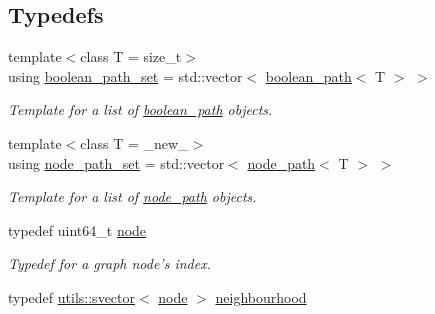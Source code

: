\subsection*{Typedefs}
\begin{DoxyCompactItemize}
\item 
\hypertarget{namespacelgraph_afad432931ba600ab1628d5c9595986c5}{{\footnotesize template$<$class T  = size\-\_\-t$>$ }\\using \hyperlink{namespacelgraph_afad432931ba600ab1628d5c9595986c5}{boolean\-\_\-path\-\_\-set} = std\-::vector$<$ \hyperlink{classlgraph_1_1boolean__path}{boolean\-\_\-path}$<$ T $>$ $>$}\label{namespacelgraph_afad432931ba600ab1628d5c9595986c5}

\begin{DoxyCompactList}\small\item\em Template for a list of \hyperlink{classlgraph_1_1boolean__path}{boolean\-\_\-path} objects. \end{DoxyCompactList}\item 
\hypertarget{namespacelgraph_a0570ce57129123d5816913d287f6cc73}{{\footnotesize template$<$class T  = \-\_\-new\-\_\-$>$ }\\using \hyperlink{namespacelgraph_a0570ce57129123d5816913d287f6cc73}{node\-\_\-path\-\_\-set} = std\-::vector$<$ \hyperlink{classlgraph_1_1node__path}{node\-\_\-path}$<$ T $>$ $>$}\label{namespacelgraph_a0570ce57129123d5816913d287f6cc73}

\begin{DoxyCompactList}\small\item\em Template for a list of \hyperlink{classlgraph_1_1node__path}{node\-\_\-path} objects. \end{DoxyCompactList}\item 
\hypertarget{namespacelgraph_a397169dd66adf725210a30fb7251773e}{typedef uint64\-\_\-t \hyperlink{namespacelgraph_a397169dd66adf725210a30fb7251773e}{node}}\label{namespacelgraph_a397169dd66adf725210a30fb7251773e}

\begin{DoxyCompactList}\small\item\em Typedef for a graph node's index. \end{DoxyCompactList}\item 
\hypertarget{namespacelgraph_a052e7766c13f3a43cec0aec8173fdede}{typedef \hyperlink{classlgraph_1_1utils_1_1svector}{utils\-::svector}$<$ \hyperlink{namespacelgraph_a397169dd66adf725210a30fb7251773e}{node} $>$ \hyperlink{namespacelgraph_a052e7766c13f3a43cec0aec8173fdede}{neighbourhood}}\label{namespacelgraph_a052e7766c13f3a43cec0aec8173fdede}


\end{DoxyCompactItemize}
